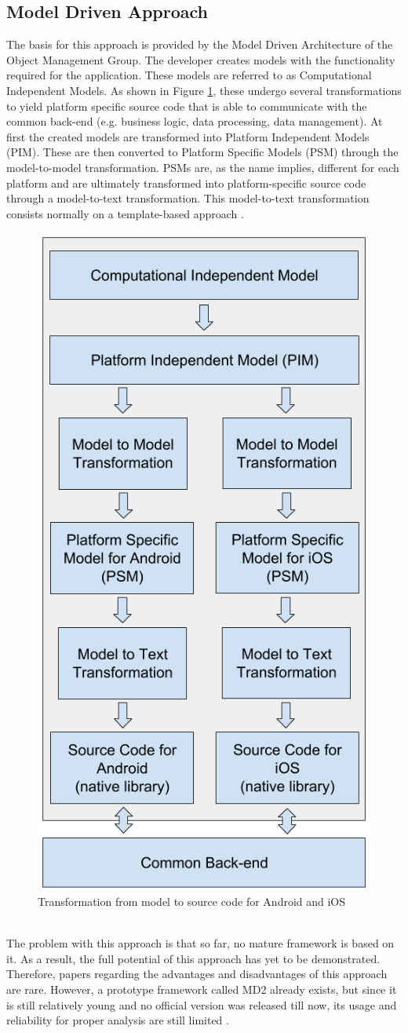 \documentclass[Bachelor,BIF,english]{twbook}
\begin{document}
\subsection{Model Driven Approach}
The basis for this approach is provided by the Model Driven Architecture of the Object Management Group. The developer creates models with the functionality required for the application. These models are referred to as Computational Independent Models. As shown in Figure \ref{Fig2}, these undergo several transformations to yield platform specific source code that is able to communicate with the common back-end (e.g. business logic, data processing, data management). At first the created models are transformed into Platform Independent Models (PIM). These are then converted to Platform Specific Models (PSM) through the model-to-model transformation. PSMs are, as the name implies, different for each platform and are ultimately transformed into platform-specific source code through a model-to-text transformation. This model-to-text transformation consists normally on a template-based approach \cite[p.~4]{7479278} \cite[p.~3]{7934674}.
\begin{figure}[!htbp]
\centering
\includegraphics[width=0.5\linewidth]{PICs/MDA.png}
\caption{Transformation from model to source code for Android and iOS \cite[p.~4]{7479278} \cite[p.~3]{7934674}}\label{Fig2}
\end{figure}
\\[\baselineskip]
The problem with this approach is that so far, no mature framework is based on it. As a result, the full potential of this approach has yet to be demonstrated. Therefore, papers regarding the advantages and disadvantages of this approach are rare. However, a prototype framework called MD2 \cite{MD2} already exists, but since it is still relatively young and no official version was released till now, its usage and reliability for proper analysis are still limited \cite[p.~3-4]{7934674}.
\end{document}
